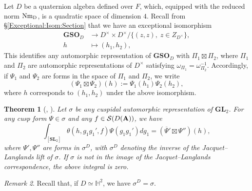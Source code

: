 \documentclass[11pt, reqno]{amsart}
\theoremstyle{plain}
\newtheorem{theorem}{Theorem}[section]
\theoremstyle{definition}
\theoremstyle{remark}
\newtheorem{remark}[theorem]{Remark}
\theoremstyle{plain}
\def\SL{{\mathbf{SL}}}
\def\A{{\bf A}}
\def\GSO{{\mathbf{GSO}}}
\def\GL{\mathbf{GL}}
\begin{document}
Let $D$ be a quaternion algebra defined over $F$, which, equipped with the reduced norm $\rm{Nm}_D$, is a quadratic space of dimension $4$. Recall from \S\ref{Exceptional:Isom:Section} that we have an exceptional isomorphism
\begin{align*}
    \GSO_{D}&\to D^{\times}\times D^{\times}/\{(z,z),\;z\in Z_{D^{\times}}\},\label{ExceptIsom}\\
    h&\mapsto (h_1,h_2),
\end{align*}
This identifies any automorphic representation of $\GSO_{D}$ with $\Pi_1\boxtimes\Pi_2$, where  $\Pi_1$ and $\Pi_2$ are automorphic representations of $D^{\times}$ satisfying $\omega_{\Pi_1} = \omega_{\Pi_2}^{-1}$. Accordingly, if $\Psi_1$ and $\Psi_2$ are forms in the space of $\Pi_1$ and $\Pi_2$, we write \[(\Psi_1\boxtimes \Psi_2)(h) := \Psi_1(h_1)\Psi_2(h_2),\]
where $h$ corresponds to $(h_1,h_2)$ under the above isomorphism. 


\begin{theorem}[{\cite[Th\'eor\`eme 1]{WaldsToricPeriods}, \cite[Theorem 2]{Shimizu:JL}}]\label{SJL}
    Let $\sigma$ be any cuspidal automorphic representation of $\GL_2$. For any cusp form $\Psi\in \sigma$ and any $f\in \mathcal{S}(D(\A))$, we have
    \[\int_{[\SL_2]} \theta(h, g_1g_1',f) \Psi( g_1g_1' )dg_1 = (\overline{\Psi}'\boxtimes\Psi'')(h),\]
    where $\Psi',\Psi''$ are forms in $ \sigma^D$, with $\sigma^D$ denoting the inverse of the Jacquet--Langlands lift of $\sigma$. If $\sigma$ is not in the image of the Jacquet--Langlands correspondence, the above integral is zero. 
\end{theorem}
\begin{remark}
   Recall that, if $D \simeq \mathbb{H}^2$, we have $\sigma^D = \sigma$. 
\end{remark}
\end{document}

